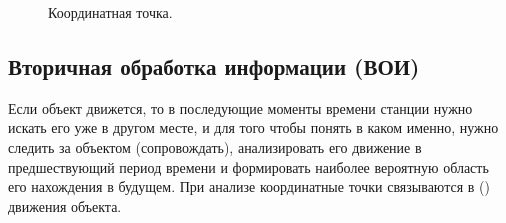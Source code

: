 \begin{figure}[!ht]
    \centering
    \caption{Координатная точка.}
\end{figure}

\subsection{Вторичная обработка информации (ВОИ)}

Если объект движется, то в последующие моменты времени станции нужно искать его уже в другом месте, и для того чтобы понять в каком
именно, нужно следить за объектом (сопровождать), анализировать его движение в предшествующий период времени и формировать наиболее
вероятную область его нахождения в будущем. При анализе координатные точки связываются в  () движения
объекта.


